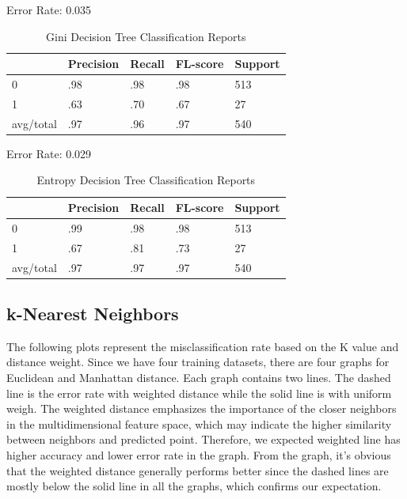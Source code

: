 \documentclass{article}
\begin{document}
\begin{table}
  \caption{Gini Decision Tree Classification Reports}
  Error Rate: 0.035
  \label{DT_Gini}
  \centering
  
  \begin{tabular}{lllll}
    \toprule
     & Precision & Recall & FL-score & Support\\
    \midrule
    0 & .98 & .98 & .98 & 513 \\
    1 & .63 & .70 & .67 & 27 \\
    avg/total & .97 & .96 & .97 & 540 \\
    \bottomrule
  \end{tabular}
\end{table}

\begin{table}
  \caption{Entropy Decision Tree Classification Reports}
  Error Rate: 0.029
  \label{DT_Entropy}
  \centering
  
  \begin{tabular}{lllll}
    \toprule
     & Precision & Recall & FL-score & Support\\
    \midrule
    0 & .99 & .98 & .98 & 513 \\
    1 & .67 & .81 & .73 & 27 \\
    avg/total & .97 & .97 & .97 & 540 \\
    \bottomrule
  \end{tabular}
\end{table}

\subsection{k-Nearest Neighbors}
The following plots represent the misclassification rate based on the K value and distance weight. Since we have four training datasets, there are four graphs for Euclidean and Manhattan distance. Each graph contains two lines. The dashed line is the error rate with weighted distance while the solid line is with uniform weigh. The weighted distance emphasizes the importance of the closer neighbors in the multidimensional feature space, which may indicate the higher similarity between neighbors and predicted point. Therefore, we expected weighted line has higher accuracy and lower error rate in the graph. From the graph, it’s obvious that the weighted distance generally performs better since the dashed lines are mostly below the solid line in all the graphs, which confirms our expectation. 
\end{document}
